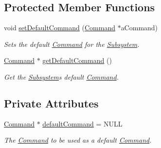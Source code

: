 \subsection*{Protected Member Functions}
\begin{DoxyCompactItemize}
\item 
void \mbox{\hyperlink{classlib_iterative_robot_1_1_subsystem_a6fff5c5756245ac750c2b26ee0ed2be7}{set\+Default\+Command}} (\mbox{\hyperlink{classlib_iterative_robot_1_1_command}{Command}} $\ast$a\+Command)
\begin{DoxyCompactList}\small\item\em Sets the default \mbox{\hyperlink{classlib_iterative_robot_1_1_command}{Command}} for the \mbox{\hyperlink{classlib_iterative_robot_1_1_subsystem}{Subsystem}}. \end{DoxyCompactList}\item 
\mbox{\hyperlink{classlib_iterative_robot_1_1_command}{Command}} $\ast$ \mbox{\hyperlink{classlib_iterative_robot_1_1_subsystem_a7e0c4904d9ff8ad2e4b6bc98d0f9579f}{get\+Default\+Command}} ()
\begin{DoxyCompactList}\small\item\em Get the \mbox{\hyperlink{classlib_iterative_robot_1_1_subsystem}{Subsystem}}\textquotesingle{}s default \mbox{\hyperlink{classlib_iterative_robot_1_1_command}{Command}}. \end{DoxyCompactList}\end{DoxyCompactItemize}
\subsection*{Private Attributes}
\begin{DoxyCompactItemize}
\item 
\mbox{\label{classlib_iterative_robot_1_1_subsystem_a1a98d727550c3a59b6a852b3ec7277cb}} 
\mbox{\hyperlink{classlib_iterative_robot_1_1_command}{Command}} $\ast$ \mbox{\hyperlink{classlib_iterative_robot_1_1_subsystem_a1a98d727550c3a59b6a852b3ec7277cb}{default\+Command}} = N\+U\+LL
\begin{DoxyCompactList}\small\item\em The \mbox{\hyperlink{classlib_iterative_robot_1_1_command}{Command}} to be used as a default \mbox{\hyperlink{classlib_iterative_robot_1_1_command}{Command}}. \end{DoxyCompactList}\end{DoxyCompactItemize}
